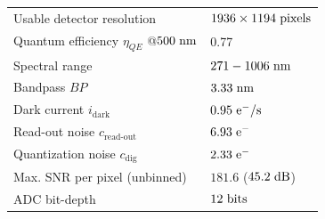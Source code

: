 \begin{table}[htbp]
\begin{tabular}{l l}
				Usable detector resolution & $1936 \times 1194  \hspace{3pt} \rm{pixels}$ \\
				Quantum efficiency $\eta_{QE}$ @$500\hspace{3pt} \rm{nm}$ & 0.77 \\
				Spectral range &  $271-1006 \hspace{3pt} \rm{nm}$ \\ 
			    Bandpass $BP$ & $3.33 \hspace{3pt} \rm{nm}$ \\
				Dark current $i_{\text{dark}}$ & $0.95 \hspace{3pt} \rm{e}^{-}/\rm{s}$ \\
				Read-out noise $c_{\text{read-out}}$ & $6.93 \hspace{3pt} \rm{e}^{-}$ \\
				Quantization noise $c_{\text{dig}}$ & $2.33 \hspace{3pt} \rm{e}^{-}$ \\
				Max. SNR per pixel (unbinned) & $181.6$ ($45.2 \hspace{3pt} \rm{dB}$) \\
			    ADC bit-depth & $12\hspace{3pt}\rm{bits}$ \\
				\hline
				\end{tabular}
\end{table}
